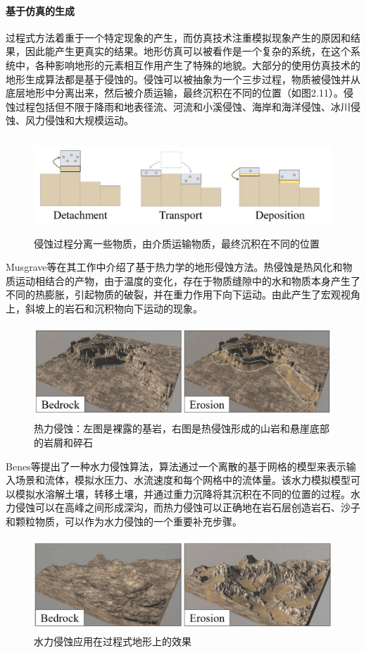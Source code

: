 \paragraph{基于仿真的生成}
过程式方法着重于一个特定现象的产生，而仿真技术注重模拟现象产生的原因和结果，因此能产生更真实的结果。地形仿真可以被看作是一个复杂的系统，在这个系统中，各种影响地形的元素相互作用产生了特殊的地貌。大部分的使用仿真技术的地形生成算法都是基于侵蚀的。侵蚀可以被抽象为一个三步过程，物质被侵蚀并从底层地形中分离出来，然后被介质运输，最终沉积在不同的位置（如图2.11）。侵蚀过程包括但不限于降雨和地表径流、河流和小溪侵蚀、海岸和海洋侵蚀、冰川侵蚀、风力侵蚀和大规模运动。\par
\begin{figure}[htbp]
\centering
\includegraphics[height=3.6cm,width=12.5cm]{figures/simulation.JPG}
\caption{侵蚀过程分离一些物质，由介质运输物质，最终沉积在不同的位置\supercite{eric-review}}
\end{figure}
Musgrave等\supercite{Musgrave1998T}在其工作中介绍了基于热力学的地形侵蚀方法。热侵蚀是热风化和物质运动相结合的产物，由于温度的变化，存在于物质缝隙中的水和物质本身产生了不同的热膨胀，引起物质的破裂，并在重力作用下向下运动。由此产生了宏观视角上，斜坡上的岩石和沉积物向下运动的现象。
\begin{figure}[htbp]
\centering
\includegraphics[height=3.5cm,width=11.4cm]{figures/thermal.JPG}
\caption{热力侵蚀：左图是裸露的基岩，右图是热侵蚀形成的山岩和悬崖底部的岩屑和碎石\supercite{eric-review}}
\end{figure}
Benes等\supercite{Bene2002Visual}提出了一种水力侵蚀算法，算法通过一个离散的基于网格的模型来表示输入场景和流体，模拟水压力、水流速度和每个网格中的流体量。该水力模拟模型可以模拟水溶解土壤，转移土壤，并通过重力沉降将其沉积在不同的位置的过程。水力侵蚀可以在高峰之间形成深沟，而热力侵蚀可以正确地在岩石层创造岩石、沙子和颗粒物质，可以作为水力侵蚀的一个重要补充步骤。
\begin{figure}[htbp]
\centering
\includegraphics[height=3.5cm,width=11.4cm]{figures/hydraulic.JPG}
\caption{水力侵蚀应用在过程式地形上的效果\supercite{eric-review}}
\end{figure}
